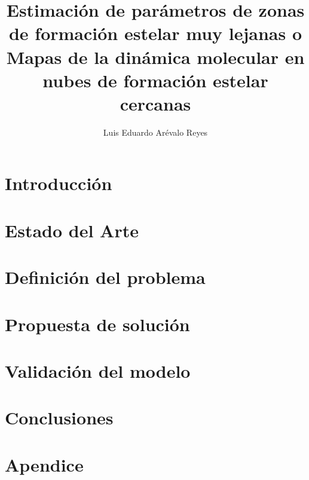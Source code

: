 \documentclass[a4paper, 11pt]{report}
\author{Luis Eduardo Arévalo Reyes}
\title{Estimación de parámetros de zonas de formación estelar muy lejanas o \\ Mapas de la dinámica molecular en nubes de formación estelar cercanas}
\begin{document}
\nocite{*}
	\titlep
	\newpage	
	
		
	\newpage
	
	
	\newpage

	\glsaddall
	\printglossary[title=Lista de términos]
	\printglossary[type=\acronymtype,title=Lista de acrónimos]
	\newpage
	
	\tableofcontents
	\listoffigures			
	\listoftables
	

	\chapter{Introducción}
	
		
	\chapter{Estado del Arte}\label{eda}
	
	
	\chapter{Definición del problema}\label{defProblema}
	

	\chapter{Propuesta de solución}\label{solucion}
	
	
	\chapter{Validación del modelo}\label{validacion}
		

	\chapter{Conclusiones}\label{conclusiones}
		
	
	\appendix
	
	\chapter{Apendice}
	\clearpage
	
	\renewcommand{\refname}{\section{Bibliografía}}	
	
	
\end{document}
